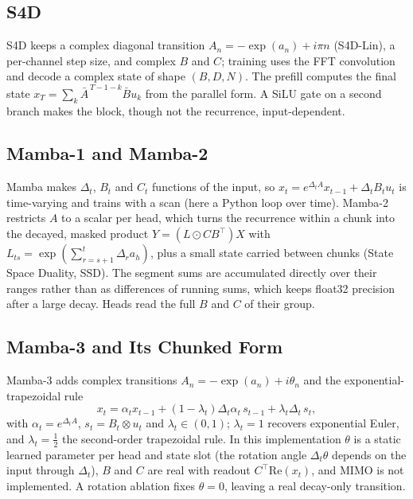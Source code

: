 \documentclass[conference]{IEEEtran}
\newcommand{\mamba}{Mamba}
\begin{document}
\subsection{S4D}
S4D \cite{gu2022s4d} keeps a complex diagonal transition
$A_n=-\exp(a_n)+i\pi n$ (S4D-Lin), a per-channel step size, and complex $B$ and
$C$; training uses the FFT convolution and decode a complex state of shape
$(B,D,N)$. The prefill computes the final state
$x_T=\sum_k \bar{A}^{\,T-1-k}\bar{B}u_k$ from the parallel form. A SiLU gate on a
second branch makes the block, though not the recurrence, input-dependent.

\subsection{\mamba{}-1 and \mamba{}-2}
\mamba{} \cite{gu2023mamba} makes $\Delta_t$, $B_t$ and $C_t$ functions of the
input, so $x_t = e^{\Delta_t A}x_{t-1}+\Delta_t B_t u_t$ is time-varying and
trains with a scan (here a Python loop over time). \mamba{}-2
\cite{dao2024transformers} restricts $A$ to a scalar per head, which turns the
recurrence within a chunk into the decayed, masked product
$Y=(L\odot CB^{\top})X$ with $L_{ts}=\exp(\sum_{r=s+1}^{t}\Delta_r a_h)$, plus a
small state carried between chunks (State Space Duality, SSD). The segment sums
are accumulated directly over their ranges rather than as differences of
running sums, which keeps float32 precision after a large decay. Heads read the
full $B$ and $C$ of their group.

\subsection{\mamba{}-3 and Its Chunked Form}
\label{sec:m3}
\mamba{}-3 \cite{lahoti2026mamba3} adds complex transitions
$A_n=-\exp(a_n)+i\theta_n$ and the exponential-trapezoidal rule
\begin{equation}
x_t = \alpha_t x_{t-1} + (1-\lambda_t)\Delta_t \alpha_t\, s_{t-1} + \lambda_t \Delta_t\, s_t,
\label{eq:trap}
\end{equation}
with $\alpha_t=e^{\Delta_t A}$, $s_t=B_t\otimes u_t$ and
$\lambda_t\in(0,1)$; $\lambda_t=1$ recovers exponential Euler, and
$\lambda_t=\tfrac12$ the second-order trapezoidal rule. In this implementation
$\theta$ is a static learned parameter per head and state slot (the rotation
angle $\Delta_t\theta$ depends on the input through $\Delta_t$), $B$ and $C$ are
real with readout $C^{\top}\mathrm{Re}(x_t)$, and MIMO is not implemented. A
rotation ablation fixes $\theta=0$, leaving a real decay-only transition.
\end{document}

